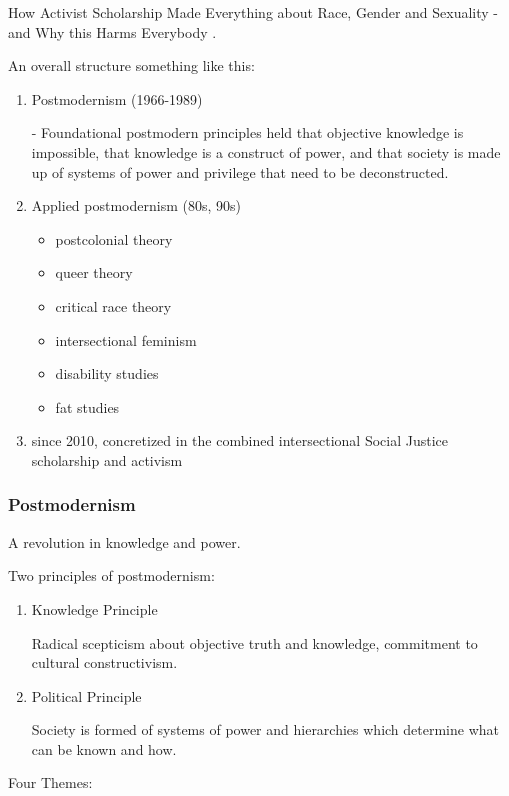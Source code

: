 \documentclass[10pt,titlepage]{book}
\begin{document}
How Activist Scholarship Made Everything about Race, Gender and Sexuality - and Why this Harms Everybody \cite{pluckrose-cynical}.

An overall structure something like this:

\begin{enumerate}

\item Postmodernism (1966-1989)

   - Foundational postmodern principles held that objective knowledge is impossible, that knowledge is a construct of power, and that society is made up of systems of power and privilege that need to be deconstructed.

\item Applied postmodernism (80s, 90s)

  \begin{itemize}
  \item postcolonial theory
  \item queer theory
  \item critical race theory
  \item intersectional feminism
  \item disability studies
  \item fat studies
  \end{itemize}

\item since 2010, concretized in the combined intersectional Social Justice scholarship and activism
\end{enumerate}


\subsubsection{Postmodernism}
A revolution in knowledge and power.

Two principles of postmodernism:

\begin{enumerate}
\item Knowledge Principle

  Radical scepticism about objective truth and knowledge, commitment to cultural constructivism.
  
\item Political Principle

  Society is formed of systems of power and hierarchies which determine what can be known and how.
  \end{enumerate}

Four Themes:
\end{document}
